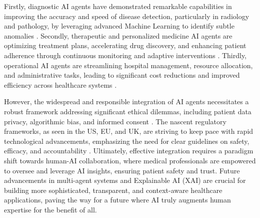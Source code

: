 \documentclass[12pt,a4paper]{article}
\begin{document}
Firstly, diagnostic AI agents have demonstrated remarkable capabilities in improving the accuracy and speed of disease detection, particularly in radiology and pathology, by leveraging advanced Machine Learning to identify subtle anomalies \cite{rajpurkar2017chexnet}. Secondly, therapeutic and personalized medicine AI agents are optimizing treatment plans, accelerating drug discovery, and enhancing patient adherence through continuous monitoring and adaptive interventions \cite{topol2019deep}. Thirdly, operational AI agents are streamlining hospital management, resource allocation, and administrative tasks, leading to significant cost reductions and improved efficiency across healthcare systems \cite{davenport2019ai}.

However, the widespread and responsible integration of AI agents necessitates a robust framework addressing significant ethical dilemmas, including patient data privacy, algorithmic bias, and informed consent \cite{nih_ethical_implications}. The nascent regulatory frameworks, as seen in the US, EU, and UK, are striving to keep pace with rapid technological advancements, emphasizing the need for clear guidelines on safety, efficacy, and accountability \cite{fda_ai_ml_samd, regdesk_eu_ai_act, gov_uk_mhra_roadmap}. Ultimately, effective integration requires a paradigm shift towards human-AI collaboration, where medical professionals are empowered to oversee and leverage AI insights, ensuring patient safety and trust. Future advancements in multi-agent systems and Explainable AI (XAI) are crucial for building more sophisticated, transparent, and context-aware healthcare applications, paving the way for a future where AI truly augments human expertise for the benefit of all.

\printbibliography[heading=bibintoc]
\end{document}

